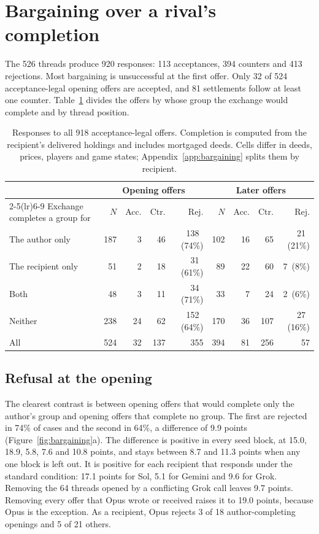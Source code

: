 \section{Bargaining over a rival's completion}
\label{sec:bargaining}

The 526 threads produce 920 responses: 113 acceptances, 394 counters and 413 rejections. Most bargaining is unsuccessful at the first offer. Only 32 of 524 acceptance-legal opening offers are accepted, and 81 settlements follow at least one counter. Table~\ref{tab:census} divides the offers by whose group the exchange would complete and by thread position.

\begin{table}[t]
\centering\small
\begin{tabular}{@{}lrrrrrrrr@{}}
\toprule
& \multicolumn{4}{c}{Opening offers} & \multicolumn{4}{c}{Later offers}\\
\cmidrule(lr){2-5}\cmidrule(lr){6-9}
Exchange completes a group for & $N$ & Acc. & Ctr. & Rej. & $N$ & Acc. & Ctr. & Rej.\\
\midrule
The author only & 187 & 3 & 46 & 138 \,(74\%) & 102 & 16 & 65 & 21 \,(21\%)\\
The recipient only & 51 & 2 & 18 & 31 \,(61\%) & 89 & 22 & 60 & 7 \,(8\%)\\
Both & 48 & 3 & 11 & 34 \,(71\%) & 33 & 7 & 24 & 2 \,(6\%)\\
Neither & 238 & 24 & 62 & 152 \,(64\%) & 170 & 36 & 107 & 27 \,(16\%)\\
\midrule
All & 524 & 32 & 137 & 355 & 394 & 81 & 256 & 57\\
\bottomrule
\end{tabular}
\caption{Responses to all 918 acceptance-legal offers. Completion is computed from the recipient's delivered holdings and includes mortgaged deeds. Cells differ in deeds, prices, players and game states; Appendix~\ref{app:bargaining} splits them by recipient.}
\label{tab:census}
\end{table}

\subsection{Refusal at the opening}

The clearest contrast is between opening offers that would complete only the author's group and opening offers that complete no group. The first are rejected in 74\% of cases and the second in 64\%, a difference of 9.9 points (Figure~\ref{fig:bargaining}a). The difference is positive in every seed block, at 15.0, 18.9, 5.8, 7.6 and 10.8 points, and stays between 8.7 and 11.3 points when any one block is left out. It is positive for each recipient that responds under the standard condition: 17.1 points for Sol, 5.1 for Gemini and 9.6 for Grok. Removing the 64 threads opened by a conflicting Grok call leaves 9.7 points. Removing every offer that Opus wrote or received raises it to 19.0 points, because Opus is the exception. As a recipient, Opus rejects 3 of 18 author-completing openings and 5 of 21 others.

